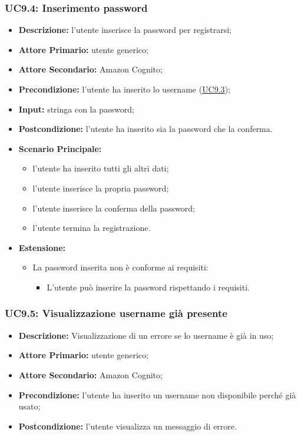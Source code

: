 \subsubsection{UC9.4: Inserimento password}
\label{sec:UC9.4}
\begin{itemize}
    \item \textbf{Descrizione:} l'utente inserisce la password per registrarsi;
    \item \textbf{Attore Primario:} utente generico;
    \item \textbf{Attore Secondario:} Amazon Cognito;
    \item \textbf{Precondizione:} l'utente ha inserito lo username (\hyperref[sec:UC9.3]{\underline{UC9.3}});
    \item \textbf{Input:} stringa con la password;
    \item \textbf{Postcondizione:} l'utente ha inserito sia la password che la conferma.
    \item \textbf{Scenario Principale:}
          \begin{itemize}
              \item l'utente ha inserito tutti gli altri dati;
              \item l'utente inserisce la propria password;
              \item l'utente inserisce la conferma della password;
              \item l'utente termina la registrazione.
          \end{itemize}
    \item \textbf{Estensione:}
          \begin{itemize}
              \item La password inserita non è conforme ai requisiti:
                    \begin{itemize}
                        \item L'utente può inserire la password rispettando i requisiti.
                    \end{itemize}
          \end{itemize}
\end{itemize}


\subsubsection{UC9.5: Visualizzazione username già presente}
\label{sec:UC9.5}
\begin{itemize}
    \item \textbf{Descrizione:} Visualizzazione di un errore se lo username è già in uso;
    \item \textbf{Attore Primario:} utente generico;
    \item \textbf{Attore Secondario:} Amazon Cognito;
    \item \textbf{Precondizione:} l'utente ha inserito un username non disponibile perché già usato;
    \item \textbf{Postcondizione:} l'utente visualizza un messaggio di errore.
\end{itemize}

